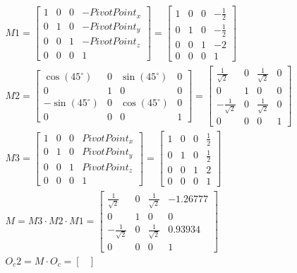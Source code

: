 \begin{gather}
	M1 = \begin{bmatrix}
	1&0&0&-\textit{PivotPoint}_x\\
	0&1&0&-\textit{PivotPoint}_y\\
	0&0&1&-\textit{PivotPoint}_z\\
	0&0&0&1
	\end{bmatrix} = 
	\begin{bmatrix}
	1&0&0&-\frac{1}{2}\\
	0&1&0&-\frac{1}{2}\\
	0&0&1&-2\\
	0&0&0&1
	\end{bmatrix}\\
	M2 = \begin{bmatrix}
	\cos(45^\circ)&0&\sin(45^\circ)&0\\
	0&1&0&0\\
	-\sin(45^\circ)&0&\cos(45^\circ)&0\\
	0&0&0&1
	\end{bmatrix}=
	\begin{bmatrix}
	\frac{1}{\sqrt{2}}&0&\frac{1}{\sqrt{2}}&0\\
	0&1&0&0\\
	-\frac{1}{\sqrt{2}}&0&\frac{1}{\sqrt{2}}&0\\
	0&0&0&1
	\end{bmatrix}\\
	M3 = 
	\begin{bmatrix}
	1&0&0&\textit{PivotPoint}_x\\
	0&1&0&\textit{PivotPoint}_y\\
	0&0&1&\textit{PivotPoint}_z\\
	0&0&0&1
	\end{bmatrix} = 
	\begin{bmatrix}
	1&0&0&\frac{1}{2}\\
	0&1&0&\frac{1}{2}\\
	0&0&1&2\\
	0&0&0&1
	\end{bmatrix}\\
	M= 
	M3 \cdot M2 \cdot M1
	= 
	\begin{bmatrix}
	\frac{1}{\sqrt{2}}&0&\frac{1}{\sqrt{2}}&-1.26777\\
	0&1&0&0\\
	-\frac{1}{\sqrt{2}}&0&\frac{1}{\sqrt{2}}&0.93934\\
	0&0&0&1
	\end{bmatrix}\\
	O_c2 = M \cdot O_c
	 = 	
	 \begin{bmatrix}

\end{bmatrix}
\end{gather}
